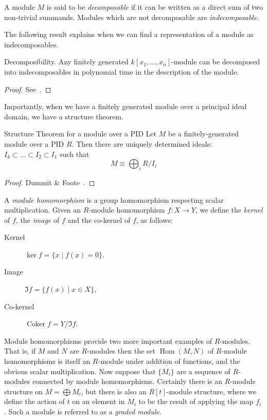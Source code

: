 \begin{definition}
A module $M$ is said to be \emph{decomposable} if it can be written as a direct sum of two non-trivial summands. Modules which are not decomposable are \emph{indecomposable}. 
\end{definition}
The following result explains when we can find a representation of a module as indecomposables.
\begin{theorem}{Decomposibility.}
Any finitely generated $k[x_1, \ldots, x_n]$-module can be decomposed into indecomposables in polynomial time in the description of the module. 
\end{theorem}
\begin{proof}
See~\cite{caikm-ptafm-1997}.
\end{proof}
Importantly, when we have a finitely generated module over a principal ideal domain, we have a structure theorem. 
\begin{theorem}{Structure Theorem for a module over a PID}
Let $M$ be a finitely-generated module over a PID $R$. Then there are uniquely determined ideals:
$I_k \subset \ldots \subset I_2  \subset I_1$ 
such that
\[ M \equiv \bigoplus_i R/I_i \]
\end{theorem}
\begin{proof}
Dummit \& Foote~\cite{dummitnfoote}.
\end{proof}
\begin{definition}
A \emph{module homomorphism} is a group homomorphism respecting scalar multiplication. Given an $R$-module homomorphism $f: X \rightarrow Y $, we define the \emph{kernel} of $f$, the \emph{image} of $f$ and the co-kernel of $f$, as follows: 
\begin{description}
\item[Kernel] $\ker{f} = \{ x \mid f(x) = 0 \}$. 
\item[Image] $\Im{f} = \{ f(x) \mid x \in X\}$, 
\item[Co-kernel] $\operatorname{Coker}{f} = Y/\Im{f}$.
\end{description}
\end{definition}

Module homomorphisms provide two more important examples of $R$-modules. That is, if $M$ and $N$ are $R$-modules then the set $\operatorname{Hom}(M,N)$ of $R$-module homomorphisms is itself an $R$-module under addition of functions, and the obvious scalar multiplication. Now suppose that $\{M_i\}$ are a sequence of $R$-modules connected by module homomorphisms. Certainly there is an $R$-module structure on $M = \bigoplus M_i$, but there is also an $R[t]$-module structure, where we define the action of $t$ on an element in $M_i$ to be the result of applying the map $f_i$. Such a module is referred to as a \emph{graded module}.

